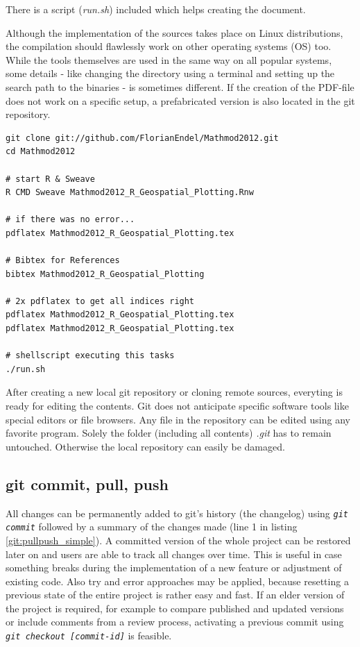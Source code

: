 \documentclass{ifacconf}
\begin{document}
There is a script (\textit{run.sh}) included which helps creating the document.

Although the implementation of the sources takes place on
Linux distributions, the compilation should flawlessly work on other operating systems (OS) too.
While the tools themselves are used in the same way on all popular systems, some details
- like changing the directory using a terminal and setting up the search path to the binaries - is sometimes different.
If the creation of the PDF-file does not work on a specific setup, a prefabricated
version is also located in the git repository. 

\begin{lstlisting}
git clone git://github.com/FlorianEndel/Mathmod2012.git
cd Mathmod2012

# start R & Sweave
R CMD Sweave Mathmod2012_R_Geospatial_Plotting.Rnw

# if there was no error...
pdflatex Mathmod2012_R_Geospatial_Plotting.tex

# Bibtex for References
bibtex Mathmod2012_R_Geospatial_Plotting

# 2x pdflatex to get all indices right
pdflatex Mathmod2012_R_Geospatial_Plotting.tex
pdflatex Mathmod2012_R_Geospatial_Plotting.tex

# shellscript executing this tasks
./run.sh
\end{lstlisting}

After creating a new local git repository or cloning remote sources, everyting is ready for
editing the contents. Git does not anticipate specific software tools like special editors or file browsers. Any file in 
the repository can be edited using any favorite program. Solely the folder (including all contents)
\textit{.git} has to remain untouched. Otherwise the local repository can easily be damaged.

\subsection{git commit, pull, push}
All changes can be permanently 
added to git's history (the changelog) using \textit{\lstinline!git commit!} followed by a 
summary of the changes made (line 1 in listing \ref{git:pullpush_simple}). 
A committed version of the whole project can be restored later on and users are able to
track all changes over time. This is useful in case something breaks during 
the implementation of a new feature or adjustment of existing code.
Also try and error approaches may be applied, because resetting a previous state of the entire project is 
rather easy and fast. If an elder version of the project is required, for example to compare 
published and updated versions or include comments from a review process, activating  
a previous commit using \textit{\lstinline!git checkout [commit-id]!} is feasible.
\end{document}
